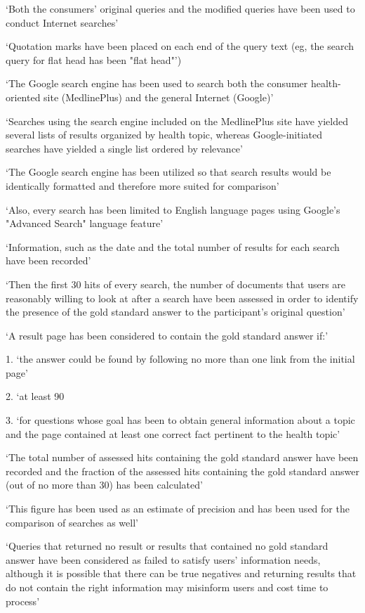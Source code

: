 \documentclass[]{article}
\begin{document}
{{{‘Both the consumers' original queries and the modified queries have been used to conduct Internet searches’

‘Quotation marks have been placed on each end of the query text (eg, the search query for flat head has been "flat head"’)

‘The Google search engine has been used to search both the consumer health-oriented site (MedlinePlus) and the general Internet (Google)’

‘Searches using the search engine included on the MedlinePlus site have yielded several lists of results organized by health topic, whereas Google-initiated searches have yielded a single list ordered by relevance’ 

‘The Google search engine has been utilized so that search results would be identically formatted and therefore more suited for comparison’

‘Also, every search has been limited to English language pages using Google's "Advanced Search" language feature’

‘Information, such as the date and the total number of results for each search have been recorded’

‘Then the first 30 hits of every search, the number of documents that users are reasonably willing to look at after a search have been assessed in order to identify the presence of the gold standard answer to the participant's original question’ 

‘A result page has been considered to contain the gold standard answer if:’

1.	‘the answer could be found by following no more than one link from the initial page’

2.	‘at least 90%

3.	‘for questions whose goal has been to obtain general information about a topic and the page contained at least one correct fact pertinent to the health topic’

‘The total number of assessed hits containing the gold standard answer have been recorded and the fraction of the assessed hits containing the gold standard answer (out of no more than 30) has been calculated’

‘This figure has been used as an estimate of precision and has been used for the comparison of searches as well’

‘Queries that returned no result or results that contained no gold standard answer have been considered as failed to satisfy users' information needs, although it is possible that there can be true negatives and returning results that do not contain the right information may misinform users and cost time to process’

}}}
\end{document}
